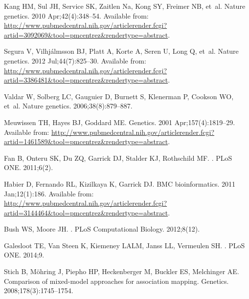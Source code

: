 \documentclass[10pt,letterpaper]{article}
\begin{document}
\begin{thebibliography}{10}
Kang HM, Sul JH, Service SK, Zaitlen Na, Kong SY, Freimer NB, et~al.
\newblock Nature genetics. 2010 Apr;42(4):348--54.
\newblock Available from:
  \url{http://www.pubmedcentral.nih.gov/articlerender.fcgi?artid=3092069\&tool=pmcentrez\&rendertype=abstract}.

Segura V, Vilhj\'{a}lmsson BJ, Platt A, Korte A, Seren U, Long Q, et~al.
\newblock Nature genetics. 2012 Jul;44(7):825--30.
\newblock Available from:
  \url{http://www.pubmedcentral.nih.gov/articlerender.fcgi?artid=3386481\&tool=pmcentrez\&rendertype=abstract}.

Valdar W, Solberg LC, Gauguier D, Burnett S, Klenerman P, Cookson WO, et~al.
\newblock Nature genetics. 2006;38(8):879--887.

Meuwissen TH, Hayes BJ, Goddard ME.
\newblock Genetics. 2001 Apr;157(4):1819--29.
\newblock Available from:
  \url{http://www.pubmedcentral.nih.gov/articlerender.fcgi?artid=1461589\&tool=pmcentrez\&rendertype=abstract}.

Fan B, Onteru SK, Du ZQ, Garrick DJ, Stalder KJ, Rothschild MF.
.
\newblock PLoS ONE. 2011;6(2).

Habier D, Fernando RL, Kizilkaya K, Garrick DJ.
\newblock BMC bioinformatics. 2011 Jan;12(1):186.
\newblock Available from:
  \url{http://www.pubmedcentral.nih.gov/articlerender.fcgi?artid=3144464\&tool=pmcentrez\&rendertype=abstract}.

Bush WS, Moore JH.
.
\newblock PLoS Computational Biology. 2012;8(12).

Galesloot TE, {Van Steen} K, Kiemeney LALM, Janss LL, Vermeulen SH.
.
\newblock PLoS ONE. 2014;9.

Stich B, M{\"o}hring J, Piepho HP, Heckenberger M, Buckler ES, Melchinger AE.
\newblock Comparison of mixed-model approaches for association mapping.
\newblock Genetics. 2008;178(3):1745--1754.


\end{thebibliography}
\end{document}
